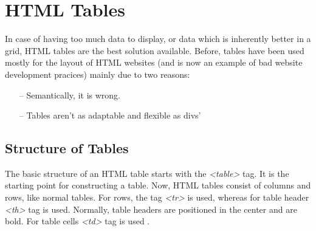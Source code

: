 %
%
%
%
%


\chapter{HTML Tables}

\label{HTML5 Tables}

In case of having too much data to display, or data which is inherently better in a grid, HTML tables
are the best solution available. Before, tables have been used mostly for the layout of
HTML websites (and is now an example of bad website development pracices) mainly due to two reasons:
\begin{itemize}
    \item[--] Semantically, it is wrong.
    \item[--] Tables aren't as adaptable and flexible as divs'
\end{itemize}

\section{Structure of Tables}

The basic structure of an HTML table starts with the \textit{<table>} tag. It is the starting
point for constructing a table. Now, HTML tables consist of columns and rows, like normal
tables. For rows, the tag  \textit{<tr>} is used, whereas for table header \textit{<th>} tag
is used. Normally, table headers are positioned in the center and are bold. For table cells
\textit{<td>} tag is used \parencite{7}.
\newpage


